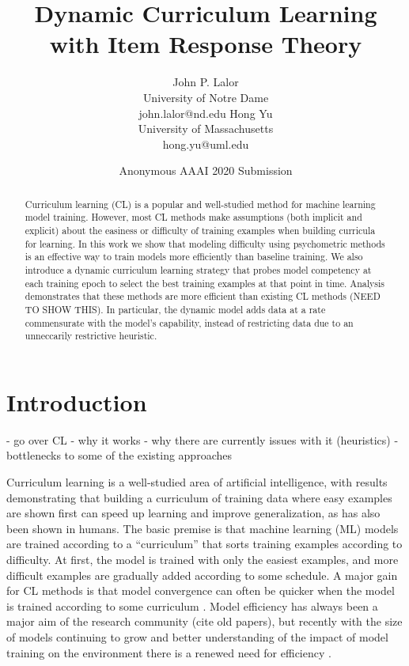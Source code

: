 \documentclass[letterpaper]{article} %
\title{Dynamic Curriculum Learning with Item Response Theory}
\author{
	John P. Lalor \\
	University of Notre Dame \\
	john.lalor@nd.edu
	\And 
	Hong Yu \\
	University of Massachusetts \\
	hong.yu@uml.edu
}
\author{
	Anonymous AAAI 2020 Submission
}
\begin{document}
\maketitle 
\begin{abstract}
	Curriculum learning (CL) is a popular and well-studied method for machine learning model training.
	However, most CL methods make assumptions (both implicit and explicit) about the easiness or difficulty of training examples when building curricula for learning.
	In this work we show that modeling difficulty using psychometric methods is an effective way to train models more efficiently than baseline training.
	We also introduce a dynamic curriculum learning strategy that probes model competency at each training epoch to select the best training examples at that point in time.
	Analysis demonstrates that these methods are more efficient than existing CL methods (NEED TO SHOW THIS).
	In particular, the dynamic model adds data at a rate commensurate with the model's capability, instead of restricting data due to an unneccarily restrictive heuristic.
\end{abstract}

\section{Introduction}
- go over CL
- why it works
- why there are currently issues with it (heuristics)
- bottlenecks to some of the existing approaches

Curriculum learning is a well-studied area of artificial intelligence, with results demonstrating that building a curriculum of training data where easy examples are shown first can speed up learning and improve generalization, as has also been shown in humans. 
The basic premise is that machine learning (ML) models are trained according to a ``curriculum'' that sorts training examples according to difficulty.
At first, the model is trained with only the easiest examples, and more difficult examples are gradually added according to some schedule.
A major gain for CL methods is that model convergence can often be quicker when the model is trained according to some curriculum \cite{bengio_curriculum_2009,platanios_competence-based_2019}.
Model efficiency has always been a major aim of the research community (cite old papers), but recently with the size of models continuing to grow and better understanding of the impact of model training on the environment there is a renewed need for efficiency \cite{strubell_energy_2019}.
\end{document}
